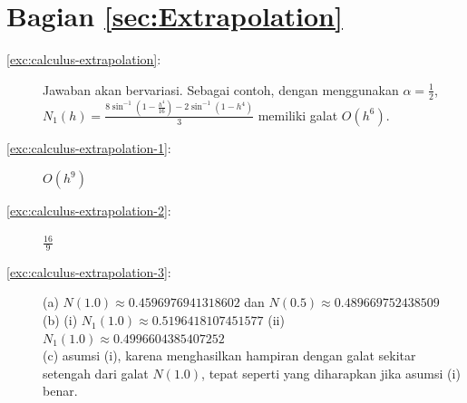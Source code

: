 \section*{Bagian \ref{sec:Extrapolation}}
\begin{description}
\item [{\ref{exc:calculus-extrapolation}:}] Jawaban akan bervariasi. Sebagai
contoh, dengan menggunakan $\alpha=\frac{1}{2}$, ${\displaystyle N_{1}(h)=\frac{8\sin^{-1}\left(1-\frac{h^{4}}{16}\right)-2\sin^{-1}\left(1-h^{4}\right)}{3}}$
memiliki galat $O(h^{6})$.
\item [{\ref{exc:calculus-extrapolation-1}:}] $O(h^{9})$
\item [{\ref{exc:calculus-extrapolation-2}:}] $\frac{16}{9}$
\item [{\ref{exc:calculus-extrapolation-3}:}] (a) $N(1.0)\approx0.4596976941318602$
dan $N(0.5)\approx0.489669752438509$\\
(b) (i) $N_{1}(1.0)\approx0.5196418107451577$ (ii) $N_{1}(1.0)\approx0.4996604385407252$\\
(c) asumsi (i), karena menghasilkan hampiran dengan galat sekitar
setengah dari galat $N(1.0)$, tepat seperti yang diharapkan jika
asumsi (i) benar.


\end{description}
